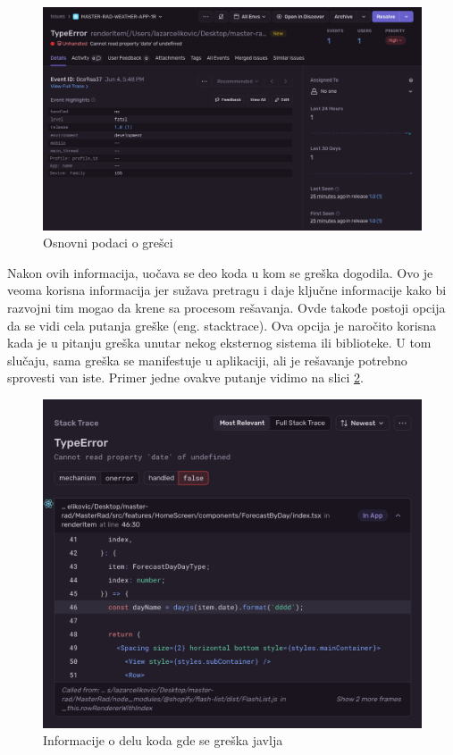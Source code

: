 \documentclass[12pt,oneside]{memoir}
\begin{document}
\begin{figure}[h!]
\centering
\includegraphics[scale=0.4]{docs/images/chapterSeven/sentryErrorBasicData.png}
\caption{Osnovni podaci o grešci}
\label{fig:sentryErrorBasicInfo}
\end{figure}

Nakon ovih informacija, uočava se deo koda u kom se greška dogodila. Ovo je veoma korisna informacija jer sužava pretragu i daje ključne informacije kako bi razvojni tim mogao da krene sa procesom rešavanja. Ovde takođe postoji opcija da se vidi cela putanja greške (eng. stacktrace). Ova opcija je naročito korisna kada je u pitanju greška unutar nekog eksternog sistema ili biblioteke. U tom slučaju, sama greška se manifestuje u aplikaciji, ali je rešavanje potrebno sprovesti van iste. Primer jedne ovakve putanje vidimo na slici \ref{fig:sentryStacktrace}.

\begin{figure}[h!]
\centering
\includegraphics[scale=0.4]{docs/images/chapterSeven/SentyErrorStacktrace.png}
\caption{Informacije o delu koda gde se greška javlja}
\label{fig:sentryStacktrace}
\end{figure}
\end{document}

